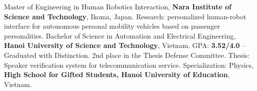 %
%
%


\begin{scholarship}
					{Master of Engineering in Human Robotics Interaction, \textbf{Nara Institute of Science and Technology}, Ikoma, Japan.
					Research: personalized human-robot interface for autonomous personal mobility vehicles based on passenger personalities.}
					{Bachelor of Science in Automation and Electrical Engineering, \textbf{Hanoi University of Science and Technology}, Vietnam.
					GPA: \textbf{3.52/4.0} -- Graduated with Distinction. 2nd place in the Thesis Defense Committee.
					Thesis: Speaker verification system for telecommunication service.}
					{Specialization: Physics, \textbf{High School for Gifted Students, Hanoi University of Education}, Vietnam.}
\end{scholarship}